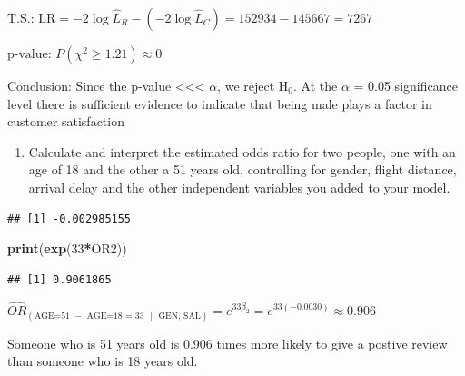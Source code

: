 \documentclass[
]{article}
\newenvironment{Shaded}{\begin{snugshade}}{\end{snugshade}}
\newcommand{\DecValTok}[1]{\textcolor[rgb]{0.00,0.00,0.81}{#1}}
\newcommand{\FunctionTok}[1]{\textcolor[rgb]{0.13,0.29,0.53}{\textbf{#1}}}
\newcommand{\NormalTok}[1]{#1}
\newcommand{\OtherTok}[1]{\textcolor[rgb]{0.56,0.35,0.01}{#1}}
\newcommand{\SpecialCharTok}[1]{\textcolor[rgb]{0.81,0.36,0.00}{\textbf{#1}}}
\newcommand{\StringTok}[1]{\textcolor[rgb]{0.31,0.60,0.02}{#1}}
\providecommand{\tightlist}{%
  \setlength{\itemsep}{0pt}\setlength{\parskip}{0pt}}
\begin{document}
\(\text{T.S.: } \text{LR}=-2\log {{\hat{L}}_{R}}-\left( -2\log {{{\hat{L}}}_{C}} \right)=152934-145667=7267\)

\(\text{p-value: } P(\chi^2 \ge 1.21) \approx 0\)

Conclusion: Since the p-value \textless\textless\textless{} \(\alpha\),
we reject \(\text{H}_{0}\). At the \(\alpha\) = 0.05 significance level
there is sufficient evidence to indicate that being male plays a factor
in customer satisfaction

\newpage

\begin{enumerate}
\def\labelenumi{\arabic{enumi}.}
\setcounter{enumi}{5}
\tightlist
\item
  Calculate and interpret the estimated odds ratio for two people, one
  with an age of 18 and the other a 51 years old, controlling for
  gender, flight distance, arrival delay and the other independent
  variables you added to your model.
\end{enumerate}

\begin{Shaded}
\end{Shaded}

\begin{verbatim}
## [1] -0.002985155
\end{verbatim}

\begin{Shaded}
\begin{Highlighting}[]
\FunctionTok{print}\NormalTok{(}\FunctionTok{exp}\NormalTok{(}\DecValTok{33}\SpecialCharTok{*}\NormalTok{OR2))}
\end{Highlighting}
\end{Shaded}

\begin{verbatim}
## [1] 0.9061865
\end{verbatim}

\({{\widehat{OR}}_{\left( \text{AGE=51 }-\text{ AGE=18 = 33  }\text{  | } \text{  GEN, SAL} \right)}}={{e}^{33{{\beta }_{2}}}}={{e}^{33\left( -0.0030 \right)}}\approx 0.906\)

Someone who is 51 years old is 0.906 times more likely to give a postive
review than someone who is 18 years old.
\end{document}
